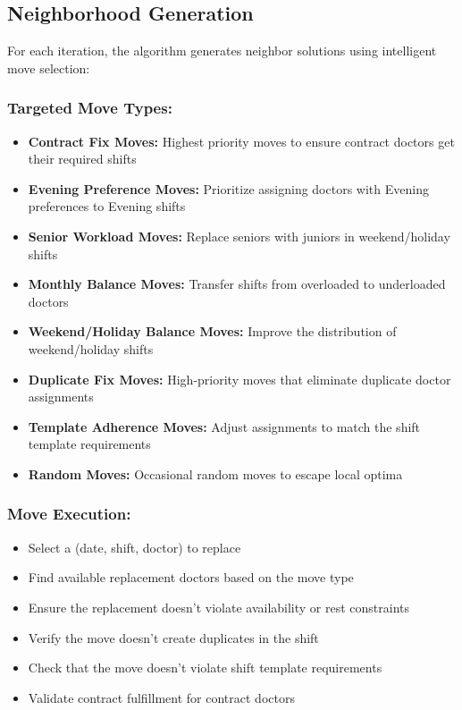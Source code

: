 \documentclass[12pt]{article}
\begin{document}
\subsection{Neighborhood Generation}

For each iteration, the algorithm generates neighbor solutions using intelligent move selection:

\subsubsection{Targeted Move Types:}
\begin{itemize}
    \item \textbf{Contract Fix Moves:} Highest priority moves to ensure contract doctors get their required shifts
    \item \textbf{Evening Preference Moves:} Prioritize assigning doctors with Evening preferences to Evening shifts
    \item \textbf{Senior Workload Moves:} Replace seniors with juniors in weekend/holiday shifts
    \item \textbf{Monthly Balance Moves:} Transfer shifts from overloaded to underloaded doctors
    \item \textbf{Weekend/Holiday Balance Moves:} Improve the distribution of weekend/holiday shifts
    \item \textbf{Duplicate Fix Moves:} High-priority moves that eliminate duplicate doctor assignments
    \item \textbf{Template Adherence Moves:} Adjust assignments to match the shift template requirements
    \item \textbf{Random Moves:} Occasional random moves to escape local optima
\end{itemize}

\subsubsection{Move Execution:}
\begin{itemize}
    \item Select a (date, shift, doctor) to replace
    \item Find available replacement doctors based on the move type
    \item Ensure the replacement doesn't violate availability or rest constraints
    \item Verify the move doesn't create duplicates in the shift
    \item Check that the move doesn't violate shift template requirements
    \item Validate contract fulfillment for contract doctors
\end{itemize}
\end{document}
